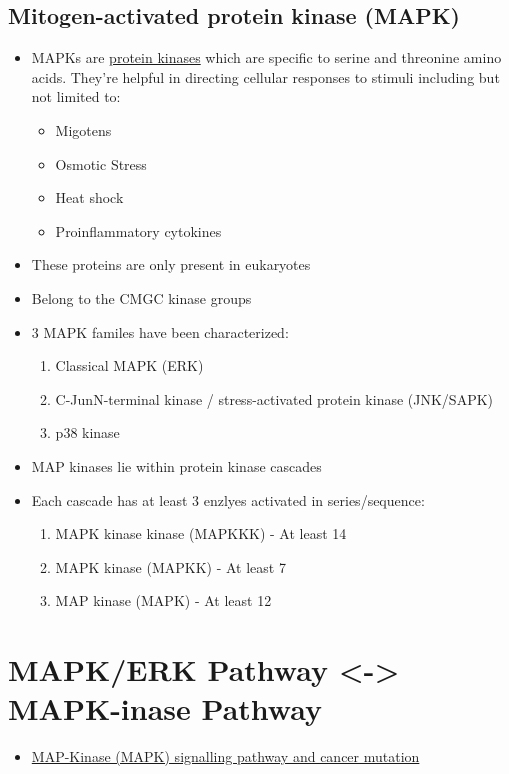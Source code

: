 \documentclass[11pt]{article}
\begin{document}
\subsection{Mitogen-activated protein kinase (MAPK)}
\label{sec:orgee93c72}
\begin{itemize}
\item MAPKs are \uline{protein kinases} which are specific to serine and threonine amino acids. They're helpful in directing cellular responses to stimuli including but not limited to:
\begin{itemize}
\item Migotens
\item Osmotic Stress
\item Heat shock
\item Proinflammatory cytokines
\end{itemize}
\item These proteins are only present in eukaryotes
\item Belong to the CMGC kinase groups
\item 3 MAPK familes have been characterized:
\begin{enumerate}
\item Classical MAPK (ERK)
\item C-JunN-terminal kinase / stress-activated protein kinase (JNK/SAPK)
\item p38 kinase
\end{enumerate}
\item MAP kinases lie within protein kinase cascades
\item Each cascade has at least 3 enzlyes activated in series/sequence:
\begin{enumerate}
\item MAPK kinase kinase (MAPKKK) - At least 14
\item MAPK kinase (MAPKK) - At least 7
\item MAP kinase (MAPK) - At least 12
\end{enumerate}
\end{itemize}

\section{MAPK/ERK Pathway <-> MAPK-inase Pathway}
\label{sec:orgbe1d176}
\begin{itemize}
\item \href{https://youtube.com/watch?v=https://www.youtube.com/watch?v=r7GoZ9vFCY8}{MAP-Kinase (MAPK) signalling pathway and cancer mutation}
\end{itemize}
\end{document}
